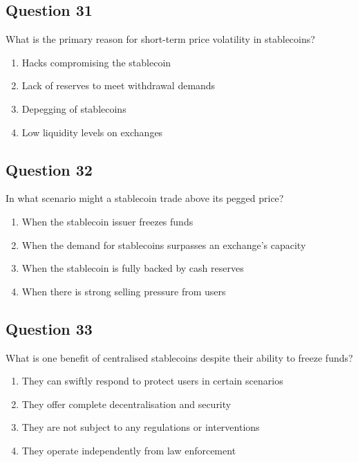 \documentclass[12pt,a4paper]{article}
\begin{document}
\bigskip


\subsection*{Question 31}
What is the primary reason for short-term price volatility in stablecoins?

\begin{enumerate}[label=\Alph*., leftmargin=*]
\item Hacks compromising the stablecoin
\item Lack of reserves to meet withdrawal demands
\item Depegging of stablecoins
\item Low liquidity levels on exchanges
\end{enumerate}

\bigskip


\subsection*{Question 32}
In what scenario might a stablecoin trade above its pegged price?

\begin{enumerate}[label=\Alph*., leftmargin=*]
\item When the stablecoin issuer freezes funds
\item When the demand for stablecoins surpasses an exchange's capacity
\item When the stablecoin is fully backed by cash reserves
\item When there is strong selling pressure from users
\end{enumerate}

\bigskip


\subsection*{Question 33}
What is one benefit of centralised stablecoins despite their ability to freeze funds?

\begin{enumerate}[label=\Alph*., leftmargin=*]
\item They can swiftly respond to protect users in certain scenarios
\item They offer complete decentralisation and security
\item They are not subject to any regulations or interventions
\item They operate independently from law enforcement
\end{enumerate}
\end{document}
